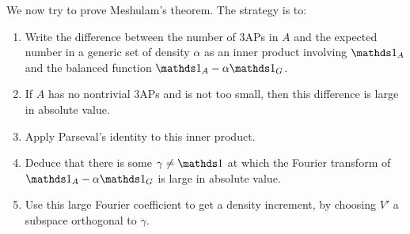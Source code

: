\documentclass[10pt,a4paper]{article}
\begin{document}
We now try to prove Meshulam's theorem. The strategy is to:
\begin{enumerate}
  \item Write the difference between the number of 3APs in $A$ and the expected number in a generic set of density $\alpha$ as an inner product involving $\one_A$ and the balanced function $\one_A-\alpha \one_G$.
  \item If $A$ has no nontrivial 3APs and is not too small, then this difference is large in absolute value.
  \item Apply Parseval's identity to this inner product.
  \item Deduce that there is some $\gamma \neq \one$ at which the Fourier transform of $\one_A - \alpha\one_G$ is large in absolute value.
  \item Use this large Fourier coefficient to get a density increment, by choosing $V'$ a subspace orthogonal to $\gamma$.
\end{enumerate}
\end{document}
